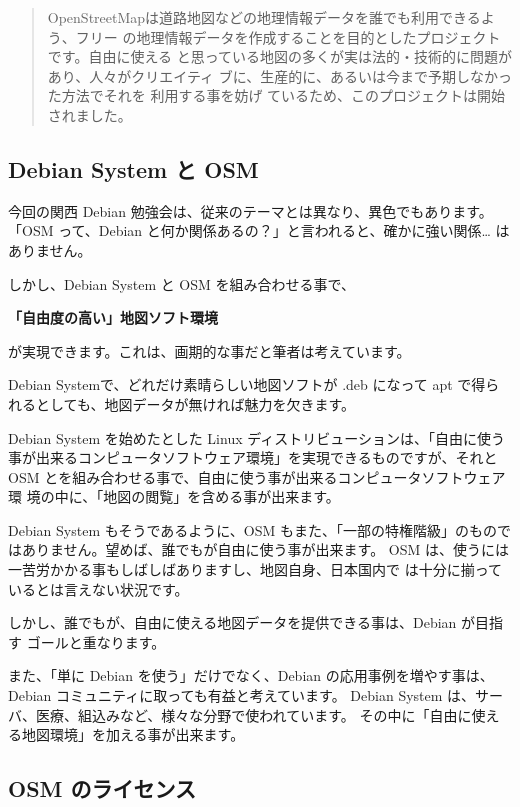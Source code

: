 \documentclass[mingoth,a4paper]{jsarticle}
\begin{document}
\begin{quotation}
OpenStreetMapは道路地図などの地理情報データを誰でも利用できるよう、フリー
の地理情報データを作成することを目的としたプロジェクトです。自由に使える
と思っている地図の多くが実は法的・技術的に問題があり、人々がクリエイティ
ブに、生産的に、あるいは今まで予期しなかった方法でそれを 利用する事を妨げ
ているため、このプロジェクトは開始されました。
\end{quotation}

\subsection{Debian System と OSM}

今回の関西 Debian 勉強会は、従来のテーマとは異なり、異色でもあります。
「OSM って、Debian と何か関係あるの？」と言われると、確かに強い関係…
はありません。

しかし、Debian System と OSM を組み合わせる事で、

\begin{center}
 \textbf{{\large「自由度の高い」地図ソフト環境} }
\end{center}

が実現できます。これは、画期的な事だと筆者は考えています。

Debian Systemで、どれだけ素晴らしい地図ソフトが .deb になって apt で得ら
れるとしても、地図データが無ければ魅力を欠きます。

Debian System を始めたとした Linux ディストリビューションは、「自由に使う
事が出来るコンピュータソフトウェア環境」を実現できるものですが、それと
OSM とを組み合わせる事で、自由に使う事が出来るコンピュータソフトウェア環
境の中に、「地図の閲覧」を含める事が出来ます。

Debian System もそうであるように、OSM もまた、「一部の特権階級」のもので
はありません。望めば、誰でもが自由に使う事が出来ます。
OSM は、使うには一苦労かかる事もしばしばありますし、地図自身、日本国内で
は十分に揃っているとは言えない状況です。

しかし、誰でもが、自由に使える地図データを提供できる事は、Debian が目指す
ゴールと重なります。

また、「単に Debian を使う」だけでなく、Debian の応用事例を増やす事は、
Debian コミュニティに取っても有益と考えています。
Debian System は、サーバ、医療、組込みなど、様々な分野で使われています。
その中に「自由に使える地図環境」を加える事が出来ます。

\subsection{OSM のライセンス}
\end{document}
